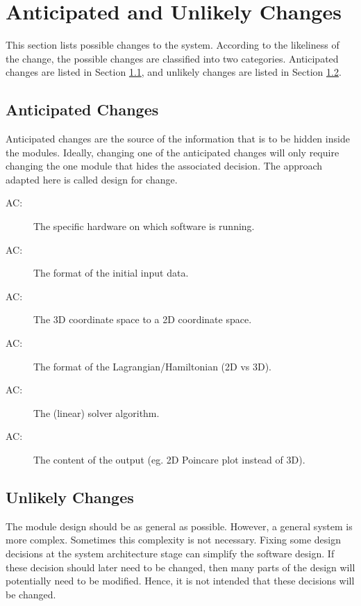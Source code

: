 \documentclass[12pt, titlepage]{article}
\newcounter{acnum}
\newcommand{\actheacnum}{AC\theacnum}
\begin{document}
\section{Anticipated and Unlikely Changes} \label{SecChange}

This section lists possible changes to the system. According to the likeliness
of the change, the possible changes are classified into two
categories. Anticipated changes are listed in Section \ref{SecAchange}, and
unlikely changes are listed in Section \ref{SecUchange}.

\subsection{Anticipated Changes} \label{SecAchange}

Anticipated changes are the source of the information that is to be hidden
inside the modules. Ideally, changing one of the anticipated changes will only
require changing the one module that hides the associated decision. 
The approach adapted here is called design for change.

\begin{description}
\item[ \actheacnum \label{acHardware}:] The specific
  hardware on which \progname software is running.
\item[ \actheacnum \label{acFormat}:] The format of the
  initial input data.
\item[ \actheacnum \label{ac3d}:] The 3D coordinate space 
  to a 2D coordinate space.
\item[ \actheacnum \label{acCoord}:] The format of the
  Lagrangian/Hamiltonian (2D vs 3D).
\item[ \actheacnum \label{acLinear}:] The (linear)
  solver algorithm.
\item[ \actheacnum \label{acCont}:] The content of the
  output (eg. 2D Poincare plot instead of 3D).
\end{description}

\subsection{Unlikely Changes} \label{SecUchange}

The module design should be as general as possible. However, a general system 
is more complex. Sometimes this complexity is not necessary. Fixing some design
decisions at the system architecture stage can simplify the software design. If
these decision should later need to be changed, then many parts of the design
will potentially need to be modified. Hence, it is not intended that these
decisions will be changed.
\end{document}
